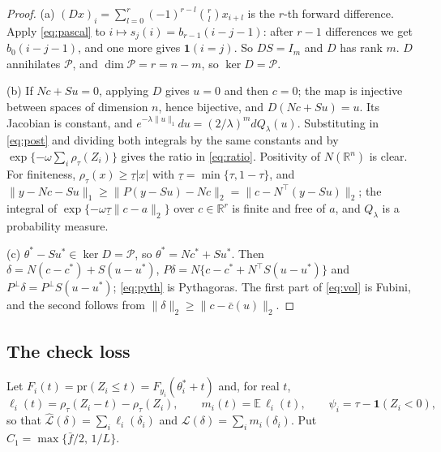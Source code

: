 \documentclass[11pt]{article}
\theoremstyle{definition}
\theoremstyle{remark}
\newcommand{\R}{\mathbb{R}}
\newcommand{\E}{\mathbb{E}}
\newcommand{\pr}{\mathrm{pr}}
\newcommand{\thetas}{\theta^{*}}
\newcommand{\om}{\omega}
\newcommand{\Lh}{\widehat{\mathcal L}}
\newcommand{\Lm}{\mathcal L}
\newcommand{\Ql}{Q_\lambda}
\newcommand{\Pp}{P^{\perp}}
\newcommand{\cP}{\mathcal P}
\newcommand{\fu}{\bar f}
\newcommand{\ind}{\mathbf 1}
\begin{document}
\begin{proof}
(a) $(Dx)_i=\sum_{l=0}^r(-1)^{r-l}\binom rlx_{i+l}$ is the $r$-th forward difference. Apply \eqref{eq:pascal} to $i\mapsto s_j(i)=b_{r-1}(i-j-1)$: after $r-1$ differences we get $b_0(i-j-1)$, and one more gives $\ind(i=j)$. So $DS=I_m$ and $D$ has rank $m$. $D$ annihilates $\cP$, and $\dim\cP=r=n-m$, so $\ker D=\cP$.

(b) If $Nc+Su=0$, applying $D$ gives $u=0$ and then $c=0$; the map is injective between spaces of dimension $n$, hence bijective, and $D(Nc+Su)=u$. Its Jacobian is constant, and $e^{-\lambda\|u\|_1}du=(2/\lambda)^md\Ql(u)$. Substituting in \eqref{eq:post} and dividing both integrals by the same constants and by $\exp\{-\om\sum_i\rho_\tau(Z_i)\}$ gives the ratio in \eqref{eq:ratio}. Positivity of $N(\R^n)$ is clear. For finiteness, $\rho_\tau(x)\ge\underline\tau|x|$ with $\underline\tau=\min\{\tau,1-\tau\}$, and $\|y-Nc-Su\|_1\ge\|P(y-Su)-Nc\|_2=\|c-N^\top(y-Su)\|_2$; the integral of $\exp\{-\om\underline\tau\|c-a\|_2\}$ over $c\in\R^r$ is finite and free of $a$, and $\Ql$ is a probability measure.

(c) $\thetas-Su^{*}\in\ker D=\cP$, so $\thetas=Nc^{*}+Su^{*}$. Then $\delta=N(c-c^{*})+S(u-u^{*})$, $P\delta=N\{c-c^{*}+N^\top S(u-u^{*})\}$ and $\Pp\delta=\Pp S(u-u^{*})$; \eqref{eq:pyth} is Pythagoras. The first part of \eqref{eq:vol} is Fubini, and the second follows from $\|\delta\|_2\ge\|c-\bar c(u)\|_2$.
\end{proof}

\subsection{The check loss}

Let $F_i(t)=\pr(Z_i\le t)=F_{y_i}(\thetas_i+t)$ and, for real $t$,
\[
\ell_i(t)=\rho_\tau(Z_i-t)-\rho_\tau(Z_i),\qquad m_i(t)=\E\,\ell_i(t),\qquad \psi_i=\tau-\ind(Z_i<0),
\]
so that $\Lh(\delta)=\sum_i\ell_i(\delta_i)$ and $\Lm(\delta)=\sum_im_i(\delta_i)$. Put $C_1=\max\{\fu/2,\,1/L\}$.
\end{document}
